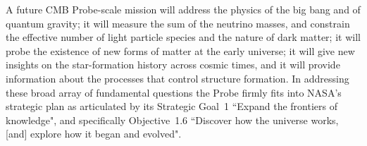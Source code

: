 A future \ac{CMB} Probe-scale mission will address the physics of the big bang and of quantum gravity; it will 
measure the sum of the neutrino masses, and constrain the effective number of light particle species and 
the nature of dark matter; it will probe the existence of new forms of matter at the early universe; it will 
give new insights on the star-formation history across cosmic times, and it will provide information about 
the processes that control structure formation. In addressing these broad array of fundamental questions the 
Probe firmly fits into NASA's strategic plan as articulated by its Strategic Goal~1 ``Expand the frontiers of knowledge", 
and specifically Objective~1.6 ``Discover how the universe works, [and] explore how it began and evolved".

